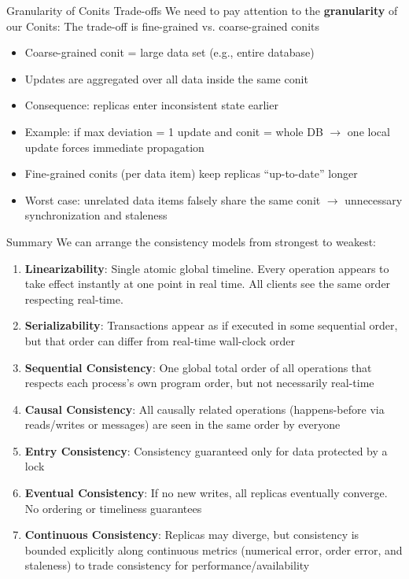 \begin{frame}{Granularity of Conits Trade-offs}
We need to pay attention to the \textbf{granularity} of our Conits:
The trade-off is fine-grained vs. coarse-grained conits
\begin{itemize}\tightlist
  \item Coarse-grained conit = large data set (e.g., entire database)
  \item Updates are aggregated over all data inside the same conit
  \item Consequence: replicas enter inconsistent state earlier
  \item Example: if max deviation = 1 update and conit = whole DB $\to$ one local update forces immediate propagation
  \item Fine-grained conits (per data item) keep replicas ``up-to-date'' longer
  \item Worst case: unrelated data items falsely share the same conit $\to$ unnecessary synchronization and staleness
\end{itemize}
\end{frame}

\begin{slide}{Summary}
We can arrange the consistency models from strongest to weakest:
\begin{enumerate}\tightlist
  \item \textbf{Linearizability}: Single atomic global timeline. Every operation appears to take effect instantly at one point in real time. All clients see the same order respecting real-time.
  \item \textbf{Serializability}: Transactions appear as if executed in some sequential order, but that order can differ from real-time wall-clock order
  \item \textbf{Sequential Consistency}: One global total order of all operations that respects each process's own program order, but not necessarily real-time
  \item \textbf{Causal Consistency}: All causally related operations (happens-before via reads/writes or messages) are seen in the same order by everyone
  \item \textbf{Entry Consistency}: Consistency guaranteed only for data protected by a lock
  \item \textbf{Eventual Consistency}: If no new writes, all replicas eventually converge. No ordering or timeliness guarantees
  \item \textbf{Continuous Consistency}: Replicas may diverge, but consistency is bounded explicitly along continuous metrics (numerical error, order error, and staleness) to trade consistency for performance/availability
\end{enumerate}
\end{slide}

